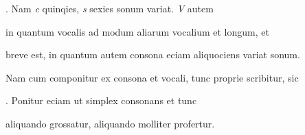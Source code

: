 
. Nam \textit{c} quinqies, \textit{s} sexies sonum variat. \textit{V} autem

in quantum vocalis ad modum aliarum vocalium et longum, et

breve est, in quantum autem consona eciam aliquociens variat sonum.

Nam cum componitur ex consona et vocali, tunc proprie scribitur, sic

 . Ponitur eciam ut simplex consonans et tunc


\fullpreviouslines


{
\color{blue}


aliquando grossatur, aliquando molliter profertur.

}

